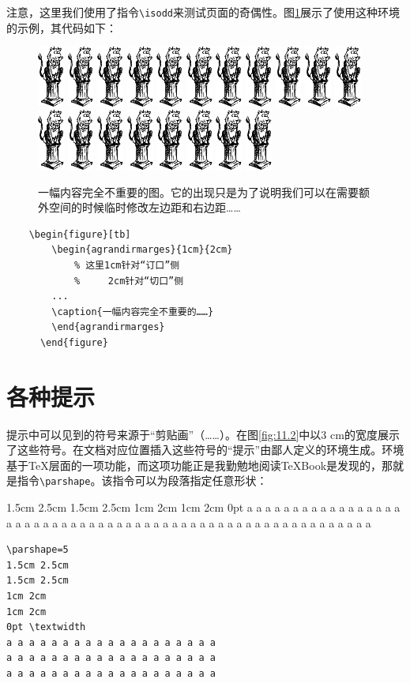 注意，这里我们使用了指令\verb|\isodd|来测试页面的奇偶性。图\ref{fig:11.1}展示了使用这种环境的示例，其代码如下：

\begin{figure}[bt]
    \centering
    \newcommand{\graphtex}{%
      \includegraphics[height=2cm]{img/knuth-tex}}
    \begin{agrandirmarges}{1cm}{2cm}
      \begin{center}
        \graphtex\graphtex\graphtex\graphtex\graphtex%
        \graphtex\graphtex\graphtex\graphtex\graphtex%
        \graphtex\graphtex\graphtex\graphtex\graphtex%
        \graphtex\graphtex\graphtex\graphtex%
      \end{center}
    \caption{一幅内容完全不重要的图。它的出现只是为了说明我们可以在需要额外空间的时候临时修改左边距和右边距……}
    \label{fig:11.1}
    \end{agrandirmarges}
\end{figure}

\begin{dmd}
\begin{verbatim}
    \begin{figure}[tb]
        \begin{agrandirmarges}{1cm}{2cm}
            % 这里1cm针对“订口”侧
            %     2cm针对“切口”侧
        ...
        \caption{一幅内容完全不重要的……}
        \end{agrandirmarges}
      \end{figure}
\end{verbatim}
\end{dmd}

\section{各种提示}

提示中可以见到的符号来源于“剪贴画”（……）。在图\ref{fig:11.2}中以3 cm的宽度展示了这些符号。在文档对应位置插入这些符号的“提示”由鄙人定义的环境生成。环境基于\TeX 层面的一项功能，而这项功能正是我勤勉地阅读\TeX Book是发现的，那就是指令\verb|\parshape|。该指令可以为段落指定任意形状：

\begin{codelist}[11.5]{
1.5cm 2.5cm
1.5cm 2.5cm
1cm 2cm
1cm 2cm
0pt \textwidth 
a a a a a a a a a a a a a a a a a a a 
a a a a a a a a a a a a a a a a a a a 
a a a a a a a a a a a a a a a a a a a 
}\begin{verbatim}
\parshape=5
1.5cm 2.5cm
1.5cm 2.5cm
1cm 2cm
1cm 2cm
0pt \textwidth 
a a a a a a a a a a a a a a a a a a a 
a a a a a a a a a a a a a a a a a a a 
a a a a a a a a a a a a a a a a a a a 
\end{verbatim}
\end{codelist}

